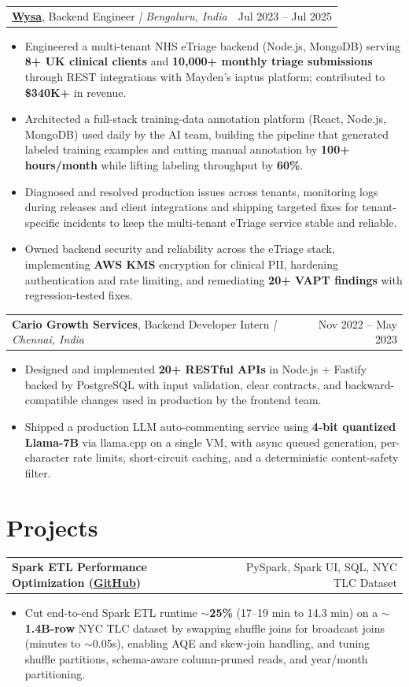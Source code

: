 \documentclass[letterpaper,11pt]{article}
\makeatletter
\newcommand{\expItem}[4]{%
  \vspace{2pt}
  \begin{tabular*}{\textwidth}{@{}l@{\extracolsep{\fill}}r@{}}
    \textbf{#1}, #2 \textit{| #3} & #4 \\
  \end{tabular*}\par\vspace{-3pt}
}
\newcommand{\projItem}[2]{%
  \vspace{2pt}
  \begin{tabular*}{\textwidth}{@{}l@{\extracolsep{\fill}}r@{}}
    \textbf{#1} & #2 \\
  \end{tabular*}\par\vspace{-3pt}
}
\makeatother
\begin{document}
\expItem{\href{https://www.wysa.io}{Wysa}}{Backend Engineer}{Bengaluru, India}{Jul 2023 -- Jul 2025}
\begin{itemize}
  \item Engineered a multi-tenant NHS eTriage backend (Node.js, MongoDB) serving \textbf{8+ UK clinical clients} and \textbf{10{,}000+ monthly triage submissions} through REST integrations with Mayden's iaptus platform; contributed to \textbf{\$340K+} in revenue.
  \item Architected a full-stack training-data annotation platform (React, Node.js, MongoDB) used daily by the AI team, building the pipeline that generated labeled training examples and cutting manual annotation by \textbf{100+ hours/month} while lifting labeling throughput by \textbf{60\%}.
  \item Diagnosed and resolved production issues across tenants, monitoring logs during releases and client integrations and shipping targeted fixes for tenant-specific incidents to keep the multi-tenant eTriage service stable and reliable.
  \item Owned backend security and reliability across the eTriage stack, implementing \textbf{AWS KMS} encryption for clinical PII, hardening authentication and rate limiting, and remediating \textbf{20+ VAPT findings} with regression-tested fixes.
\end{itemize}

\expItem{Cario Growth Services}{Backend Developer Intern}{Chennai, India}{Nov 2022 -- May 2023}
\begin{itemize}
  \item Designed and implemented \textbf{20+ RESTful APIs} in Node.js + Fastify backed by PostgreSQL with input validation, clear contracts, and backward-compatible changes used in production by the frontend team.
  \item Shipped a production LLM auto-commenting service using \textbf{4-bit quantized Llama-7B} via llama.cpp on a single VM, with async queued generation, per-character rate limits, short-circuit caching, and a deterministic content-safety filter.
\end{itemize}

\section{Projects}

\projItem{Spark ETL Performance Optimization {\normalfont\small(\href{https://github.com/Deva-1903/Spark-ETL-Optimization}{GitHub})}}{PySpark, Spark UI, SQL, NYC TLC Dataset}
\begin{itemize}
  \item Cut end-to-end Spark ETL runtime \textbf{$\sim$25\%} (17--19 min to 14.3 min) on a \textbf{$\sim$1.4B-row} NYC TLC dataset by swapping shuffle joins for broadcast joins (minutes to $\sim$0.05s), enabling AQE and skew-join handling, and tuning shuffle partitions, schema-aware column-pruned reads, and year/month partitioning.
\end{itemize}
\end{document}
